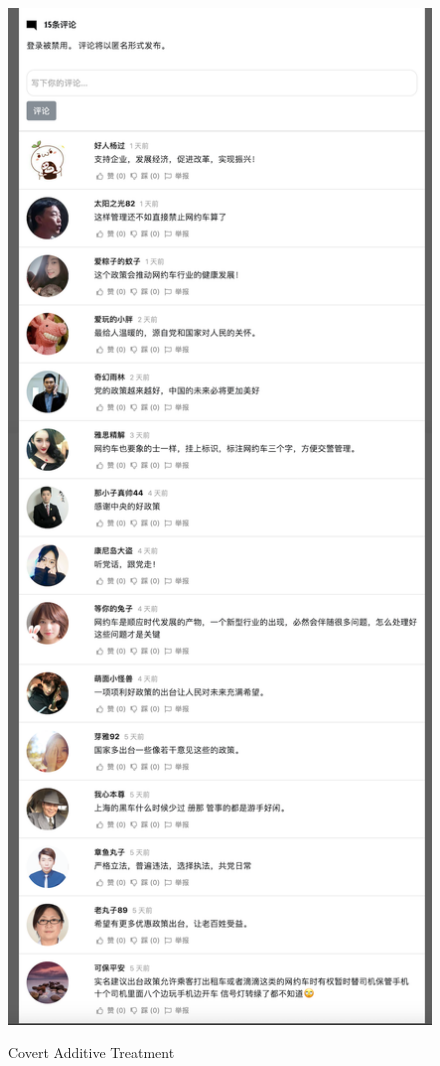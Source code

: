 \documentclass[11pt]{article}
\begin{document}
\begin{figure}
  \centering
  \caption{Covert Additive Treatment}
  \vspace{1em}
  \includegraphics[height=.9\textheight]{figures/covert_additive.png}
  \label{CA}
\end{figure}
\end{document}
